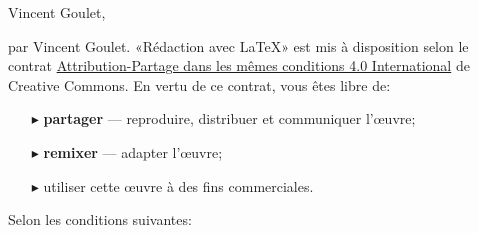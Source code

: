 
\begin{frame}[t,plain,fragile=singleslide]
  \tiny
  \vspace*{10mm}

  \begin{adjustwidth}{10mm}{10mm}
    Vincent Goulet, {\year}

    {\textcopyright} {\year} par Vincent Goulet. «Rédaction avec
    {\LaTeX}» est mis à disposition selon le contrat
    \href{http://creativecommons.org/licenses/by-sa/4.0/deed.fr}{%
      Attribution-Partage dans les mêmes conditions 4.0 International}
    de Creative Commons. En vertu de ce contrat, vous êtes libre de:
    \begin{itemize}
    \item[\color{black}\tiny$\blacktriangleright$]%
      \textbf{partager} --- reproduire, distribuer et communiquer
      l'{\oe}uvre;
    \item[\color{black}\tiny$\blacktriangleright$]%
      \textbf{remixer} --- adapter l'{\oe}uvre;
    \item[\color{black}\tiny$\blacktriangleright$] utiliser cette
      {\oe}uvre à des fins commerciales.
    \end{itemize}
    Selon les conditions suivantes: \vspace*{2mm}


\end{adjustwidth}
\end{frame}
